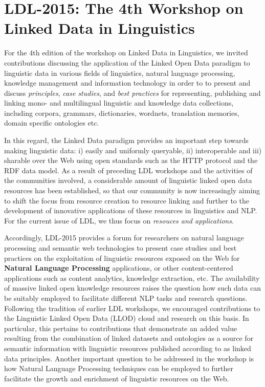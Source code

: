 \section{LDL-2015: The 4th Workshop on Linked Data in Linguistics}

For the 4th edition of the workshop on Linked Data in Linguistics, we invited contributions discussing the application of the Linked Open Data paradigm to linguistic data in various fields of linguistics, natural language processing, knowledge management and information technology in order to to present and discuss \emph{principles}, \emph{case studies}, and \emph{best practices} for representing, publishing and linking mono- and multilingual linguistic and knowledge data collections, including corpora, grammars, dictionaries, wordnets, translation memories, domain specific ontologies etc. 

In this regard, the Linked Data paradigm provides an important step towards making linguistic data: 
i) easily and uniformly queryable, 
ii) interoperable and 
iii) sharable over the Web using open standards such as the HTTP protocol and the RDF data model. 
As a result of preceding LDL workshops and the activities of the communities involved, a considerable amount of linguistic linked open data resources has been established, so that our community is now increasingly aiming to shift the focus from resource creation to resource linking and further to the development of innovative applications of these resources in linguistics and NLP. For the current issue of LDL, we thus focus on \emph{resouces and applications}.

Accordingly, LDL-2015 provides a forum for researchers on natural language processing and semantic web technologies to present case studies and best practices on the exploitation of linguistic resources exposed on the Web for \textbf{Natural Language Processing} applications, or other content-centered applications such as content analytics, knowledge extraction, etc. The availability of massive linked open knowledge resources raises the question how such data can be suitably employed to facilitate different NLP tasks and research questions. Following the tradition of earlier LDL workshops, we encouraged contributions to the Linguistic Linked Open Data (LLOD) cloud and research on this basis. In particular, this pertains to contributions that demonstrate an added value resulting from the combination of linked datasets and ontologies as a source for semantic information with linguistic resources published according to as linked data principles. Another important question to be addressed in the workshop is how Natural Language Processing techniques can be employed to further facilitate the growth and enrichment of linguistic resources on the Web.

